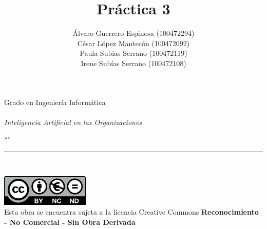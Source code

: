 \documentclass[12pt]{report} %
\begin{document}

\title{Práctica 3}
\author{Álvaro Guerrero Espinosa (100472294)\\
        César López Mantecón (100472092)\\
        Paula Subías Serrano (100472119)\\
        Irene Subías Serrano (100472108)\\}

\makeatletter
\begin{titlepage}
    \begin{sffamily}
    \color{azulUC3M}
    \begin{center}
        \begin{figure}[H] %
        \end{figure}
        \vspace{2.5cm}
        \begin{Large}
            Grado en Ingeniería Informática\\
            \@date\\
            \vspace{2cm}
            \textsl{Inteligencia Artificial en las Organizaciones}\\
            \bigskip
        \end{Large}
        {\Huge ``\@title''}\\
        \vspace*{0.5cm}
        \rule{10.5cm}{0.1mm}\\
        \vspace*{0.9cm}
        {\LARGE\@author}
        \vspace*{1cm}
    \end{center}
    \vfill
    \color{black}
    \includegraphics[width=4.2cm]{creativecommons.png}\\ %
    Esta obra se encuentra sujeta a la licencia Creative Commons \textbf{Reconocimiento - No Comercial - Sin Obra Derivada}
    \end{sffamily}
\end{titlepage}
\makeatother
\end{document}
